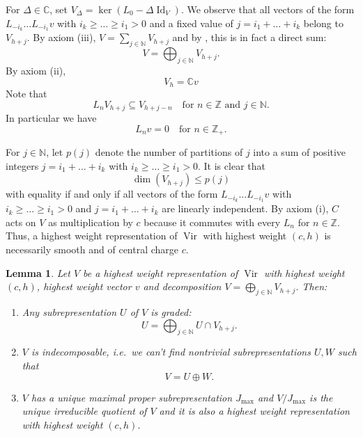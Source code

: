 \documentclass[a4paper, 12pt, reqno]{amsart}
\newtheorem{lemma}[theorem]{Lemma}
\theoremstyle{remark}
\numberwithin{equation}{subsection}
\DeclareMathOperator{\Vir}{Vir}
\DeclareMathOperator{\Id}{Id}
\begin{document}
For $\Delta \in \mathbb{C}$, set $V_{\Delta} = \ker(L_0 - \Delta\Id_V)$.
We observe that all vectors of the form $L_{-i_k}\dots L_{-i_1}v$ with $i_k \ge \dots \ge i_1 > 0$ and a fixed value of $j = i_1 + \dots + i_k$ belong to $V_{h + j}$.
By axiom (iii), $V = \sum_{j \in \mathbb{N}}V_{h + j}$ and by , this is in fact a direct sum:
\begin{equation}
  \label{eq:29}
  V = \bigoplus_{j \in \mathbb{N}}V_{h + j}.
\end{equation}
By axiom (ii),
\begin{equation}
  \label{eq:30}
  V_h = \mathbb{C}v
\end{equation}
Note that
\begin{equation}
  \label{eq:31}
  L_nV_{h + j}\subseteq V_{h + j - n} \quad \text{for }n \in \mathbb{Z}\text{ and }j \in \mathbb{N}.
\end{equation}
In particular we have
\begin{equation}
  \label{eq:32}
  L_nv = 0 \quad \text{for } n \in \mathbb{Z}_+.
\end{equation}

For $j \in \mathbb{N}$, let $p(j)$ denote the number of partitions of $j$ into a sum of positive integers $j = i_1 + \dots + i_k$ with $i_k \ge \dots \ge i_1 > 0$.
It is clear that
\begin{equation}
  \label{eq:33}
  \dim(V_{h + j}) \le p(j)
\end{equation}
with equality if and only if all vectors of the form $L_{-i_k}\dots L_{-i_1}v$ with $i_k \ge \dots \ge i_1 > 0$ and $j = i_1 + \dots + i_k$ are linearly independent.
By axiom (i), $C$ acts on $V$ as multiplication by $c$ because it commutes with every $L_n$ for $n \in \mathbb{Z}$.
Thus, a highest weight representation of $\Vir$ with highest weight $(c, h)$ is necessarily smooth and of central charge $c$.

\begin{lemma}
  \label{lmm:14}
  Let $V$ be a highest weight representation of $\Vir$ with highest weight $(c, h)$, highest weight vector $v$ and decomposition $V = \bigoplus_{j \in \mathbb{N}}V_{h + j}$.
  Then:
  \begin{enumerate}
  \item Any subrepresentation $U$ of $V$ is graded:
    \begin{equation*}
      U = \bigoplus_{j \in \mathbb{N}}U \cap V_{h + j}.
    \end{equation*}
  \item $V$ is indecomposable, i.e.\ we can't find nontrivial subrepresentations $U, W$ such that
    \begin{equation*}
      V = U \oplus W.
    \end{equation*}
  \item $V$ has a unique maximal proper subrepresentation $J_{\max}$ and $V/J_{\max}$ is the unique irreducible quotient of $V$ and it is also a highest weight representation with highest weight $(c, h)$.
  \end{enumerate}
\end{lemma}
\end{document}
